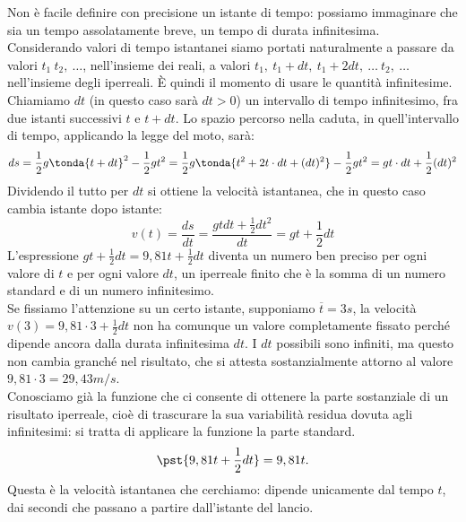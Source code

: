 Non è facile definire con precisione un istante di tempo: possiamo immaginare 
che sia un tempo assolatamente breve, un tempo di durata infinitesima.\\ 
Considerando valori di tempo istantanei siamo portati naturalmente a passare da 
valori $t_1 \ t_2, \ \dots$, nell'insieme dei reali, a valori $t_1, \ t_1+dt, \ 
t_1+2dt,\ \dots\ t_2, \ \dots$ nell'insieme degli iperreali. È quindi il momento 
di usare le quantità infinitesime.\\ Chiamiamo $dt$ (in questo caso sarà \(dt > 
0\)) un intervallo di tempo infinitesimo, fra due istanti successivi $t$ e 
$t+dt$. Lo spazio percorso nella caduta, in quell'intervallo di tempo, 
applicando la legge del moto, sarà: \[ 
ds=\frac{1}{2}g\tonda{t+dt}^2-\frac{1}{2}gt^2= \frac{1}{2}g\tonda{t^2+2t\cdot 
dt+(dt)^2}-\frac{1}{2}gt^2= gt\cdot dt+\frac{1}{2}(dt)^2\] Dividendo il tutto 
per \(dt\) si ottiene la velocità istantanea, che in questo caso cambia istante 
dopo istante: 
\[v(t)=\frac{ds}{dt}=\frac{gtdt+\frac{1}{2}dt^2}{dt}=gt+\frac{1}{2}dt\] 
L'espressione $gt+\frac{1}{2}dt=9,81t+\frac{1}{2}dt$ diventa un numero ben 
preciso per ogni valore di $t$ e per ogni valore $dt$, un iperreale finito che è 
la somma di un numero standard e di un numero infinitesimo.\\ Se fissiamo 
l'attenzione su un certo istante, supponiamo \(\overline{t}= 3s\), la velocità 
$v(3)=9,81\cdot 3+\frac{1}{2}dt$ non ha comunque un valore completamente fissato 
perché dipende ancora dalla durata infinitesima $dt$. I $dt$ possibili sono 
infiniti, ma questo non cambia granché nel risultato, che si attesta 
sostanzialmente attorno al valore $9,81\cdot 3=29,43m/s$.\\
Conosciamo già la funzione che ci consente di ottenere la parte sostanziale 
di un risultato iperreale, cioè di trascurare la sua variabilità 
residua dovuta agli infinitesimi: si tratta di applicare la funzione  
la parte standard.
\[ \pst{9,81t+\frac{1}{2}dt}=9,81t.\] 
Questa è la velocità istantanea che cerchiamo: dipende unicamente dal tempo 
\(t\), dai secondi che passano a partire dall'istante del lancio.

